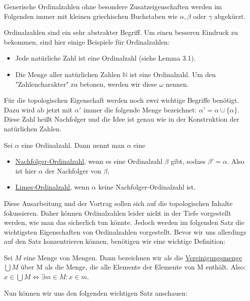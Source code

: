 \documentclass[11pt]{scrartcl}
\newcommand{\N}{\mathbb{N}}
\begin{document}
\noindent Generische Ordinalzahlen ohne besondere Zusatzeigenschaften werden im Folgenden immer mit kleinen griechischen Buchstaben wie $\alpha, \beta$ oder $\gamma$ abgekürzt.
\begin{example}Ordinalzahlen sind ein sehr abstrakter Begriff. Um einen besseren Eindruck zu bekommen, sind hier einige Beispiele für Ordinalzahlen:
	\begin{itemize}
		\item Jede natürliche Zahl ist eine Ordinalzahl (siehe Lemma 3.1).
		\item Die Menge aller natürlichen Zahlen $\N$ ist eine Ordinalzahl. Um den "Zahlencharakter" zu betonen, werden wir diese $\omega$ nennen.
	\end{itemize}
\end{example}
Für die topologischen Eigenschaft werden noch zwei wichtige Begriffe benötigt. Dazu wird ab jetzt mit $\alpha '$ immer die folgende Menge bezeichnet: $\alpha' = \alpha \cup \{ \alpha \}$. Diese Zahl heißt Nachfolger und die Idee ist genau wie in der Konstruktion der natürlichen Zahlen.
\begin{definition}
Sei $\alpha$ eine Ordinalzahl. Dann nennt man $\alpha$ eine 
\begin{itemize}
	\item \underline{Nachfolger-Ordinalzahl}, wenn es eine Ordinalzahl $\beta$ gibt, sodass $\beta'=\alpha$. Also ist hier $\alpha$ der Nachfolger von $\beta$,
	\item \underline{Limes-Ordinalzahl}, wenn $\alpha$ keine Nachfolger-Ordinalzahl ist.
\end{itemize}
\end{definition}
\noindent Diese Ausarbeitung und der Vortrag sollen sich auf die topologischen Inhalte fokussieren. Daher können Ordinalzahlen leider nicht in der Tiefe vorgestellt werden, wie man das sicherlich tun könnte. Jedoch werden im folgenden Satz die wichtigsten Eigenschaften von Ordinalzahlen vorgestellt. Bevor wir uns allerdings auf den Satz konzentrieren können, benötigen wir eine wichtige Definition:
\begin{definition}
	Sei $M$ eine Menge von Mengen. Dann bezeichnen wir als die \underline{Vereinigungsmenge $\bigcup M$} über M als die Menge, die alle Elemente der Elemente von M enthält. Also: $x\in \bigcup M \iff \exists m\in M: x\in m$.
\end{definition}
\noindent Nun können wir uns den folgenden wichtigen Satz anschauen:
\end{document}
